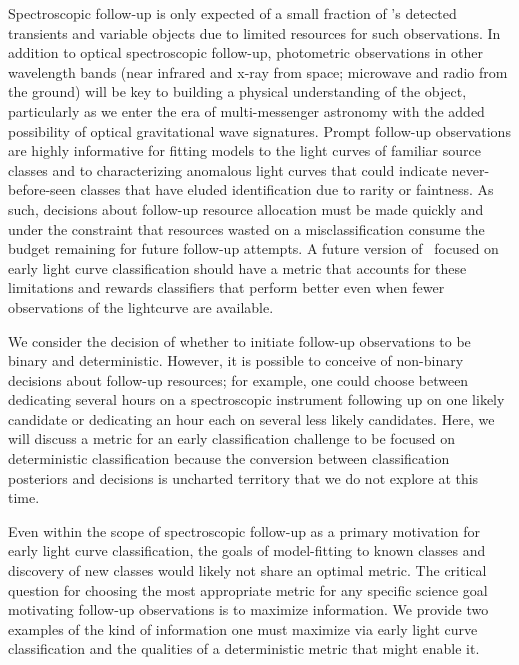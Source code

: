 Spectroscopic follow-up is only expected of a small fraction of \lsst's detected transients and variable objects due to limited resources for such observations.
In addition to optical spectroscopic follow-up, photometric observations in other wavelength bands (near infrared and x-ray from space; microwave and radio from the ground)  will be key to building a physical understanding of the object, particularly as we enter the era of multi-messenger astronomy with the added possibility of optical gravitational wave signatures.
Prompt follow-up observations are highly informative for fitting models to the light curves of familiar source classes and to characterizing anomalous light curves that could indicate never-before-seen classes that have eluded identification due to rarity or faintness.
As such, decisions about follow-up resource allocation must be made quickly and under the constraint that resources wasted on a misclassification consume the budget remaining for future follow-up attempts.
A future version of \plasticc\ focused on early light curve classification should have a metric that accounts for these limitations and rewards classifiers that perform better even when fewer observations of the lightcurve are available.

We consider the decision of whether to initiate follow-up observations to be binary and deterministic.
However, it is possible to conceive of non-binary decisions about follow-up resources; for example, one could choose between dedicating several hours on a spectroscopic instrument following up on one likely candidate or dedicating an hour each on several less likely candidates.
Here, we will discuss a metric for an early classification challenge to be focused on deterministic classification because the conversion between classification posteriors and decisions is uncharted territory that we do not explore at this time.

Even within the scope of spectroscopic follow-up as a primary motivation for early light curve classification, the goals of model-fitting to known classes and discovery of new classes would likely not share an optimal metric.
The critical question for choosing the most appropriate metric for any specific science goal motivating follow-up observations is to maximize information.
We provide two examples of the kind of information one must maximize via early light curve classification and the qualities of a deterministic metric that might enable it.

\label{sec:spec_sncosmo}

